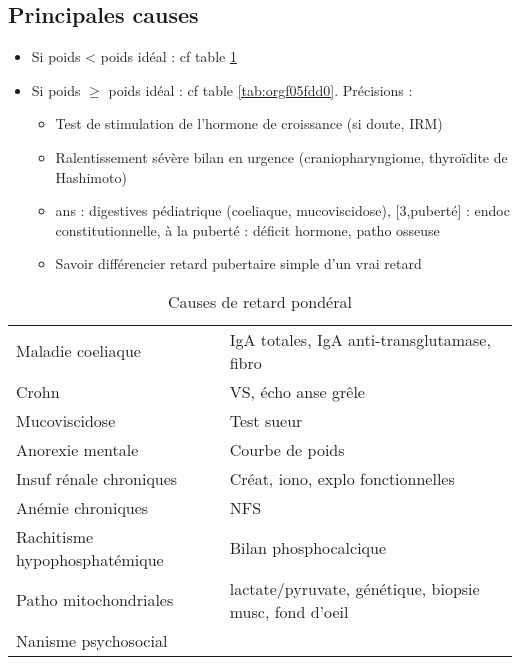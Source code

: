\documentclass{book}
\begin{document}
\subsection{Principales causes}
\label{sec:org41ca261}
\begin{itemize}
\item Si poids < poids idéal : cf table \ref{tab:orgf4ad792}
\item Si poids \(\ge\) poids idéal : cf table \ref{tab:orgf05fdd0}. Précisions :
\begin{itemize}
\item Test de stimulation de l'hormone de croissance (\danger si doute, IRM)
\item Ralentissement sévère \thus bilan en urgence (craniopharyngiome, thyroïdite de
Hashimoto) \faBomb
\item\relax [0, 3] ans : digestives pédiatrique (coeliaque, mucoviscidose), [3,puberté] :
endoc constitutionnelle, à la puberté : déficit hormone, patho osseuse
\item Savoir différencier retard pubertaire simple d'un vrai retard
\end{itemize}
\end{itemize}

\begin{table}[htbp]
\caption{\label{tab:orgf4ad792}
Causes de retard pondéral}
\centering
\begin{tabular}{ll}
\toprule
Maladie coeliaque & IgA totales, IgA anti-transglutamase, fibro\\
Crohn & VS, écho anse grêle\\
Mucoviscidose & Test sueur\\
Anorexie mentale & Courbe de poids\\
Insuf rénale chroniques & Créat, iono, explo fonctionnelles\\
Anémie chroniques & NFS\\
Rachitisme hypophosphatémique & Bilan phosphocalcique\\
Patho mitochondriales & lactate/pyruvate, génétique, biopsie musc, fond d'oeil\\
Nanisme psychosocial & \\
\bottomrule
\end{tabular}
\end{table}
\end{document}

